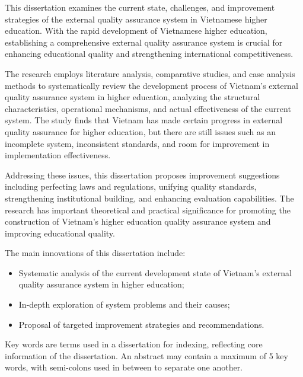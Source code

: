 \begin{eabstract}
This dissertation examines the current state, challenges, and improvement strategies of the external quality assurance system in Vietnamese higher education. With the rapid development of Vietnamese higher education, establishing a comprehensive external quality assurance system is crucial for enhancing educational quality and strengthening international competitiveness.

The research employs literature analysis, comparative studies, and case analysis methods to systematically review the development process of Vietnam's external quality assurance system in higher education, analyzing the structural characteristics, operational mechanisms, and actual effectiveness of the current system. The study finds that Vietnam has made certain progress in external quality assurance for higher education, but there are still issues such as an incomplete system, inconsistent standards, and room for improvement in implementation effectiveness.

Addressing these issues, this dissertation proposes improvement suggestions including perfecting laws and regulations, unifying quality standards, strengthening institutional building, and enhancing evaluation capabilities. The research has important theoretical and practical significance for promoting the construction of Vietnam's higher education quality assurance system and improving educational quality.

The main innovations of this dissertation include:
\begin{itemize}[$\bullet$]
  \item Systematic analysis of the current development state of Vietnam's external quality assurance system in higher education;
  \item In-depth exploration of system problems and their causes;
  \item Proposal of targeted improvement strategies and recommendations.
\end{itemize}
 
Key words are terms used in a dissertation for indexing, reflecting core information of the dissertation. An abstract may contain a maximum of 5 key words, with semi-colons used in between to separate one another.
\end{eabstract}


